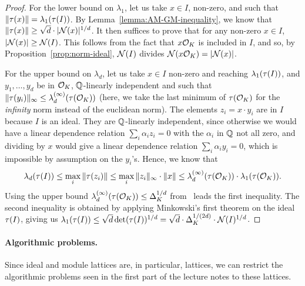 \begin{proof}
For the lower bound on $\lambda_1$, let us take $x \in I$, non-zero, and such that $\|\tau(x)\| = \lambda_1(\tau(I))$. By Lemma~\ref{lemma:AM-GM-inequality}, we know that $\|\tau(x)\| \geq \sqrt{d} \cdot |\mathcal{N}(x)|^{1/d}$. It then suffices to prove that for any non-zero $x \in I$, $|\mathcal{N}(x)| \geq \mathcal{N}(I)$. This follows from the fact that $x \mathcal{O}_K$ is included in $I$, and so, by Proposition~\ref{prop:norm-ideal}, $\mathcal{N}(I)$ divides $\mathcal{N}(x \mathcal{O}_K) = |\mathcal{N}(x)|$.

For the upper bound on $\lambda_d$, let us take $x \in I$ non-zero and reaching $\lambda_1(\tau(I))$, and $y_1, \dots, y_d$ be in $\mathcal{O}_K$, $\mathbb{Q}$-linearly independent and such that $\|\tau(y_i)\|_\infty \leq \lambda_d^{(\infty)}(\tau(\mathcal{O}_K))$ (here, we take the last minimum of $\tau(\mathcal{O}_K)$ for the \emph{infinity} norm instead of the euclidean norm). The elements $z_i = x \cdot y_i$ are in $I$ because $I$ is an ideal. They are $\mathbb{Q}$-linearly independent, since otherwise we would have a linear dependence relation $\sum_i \alpha_i z_i = 0$ with the $\alpha_i$ in $\mathbb{Q}$ not all zero, and dividing by $x$ would give a linear dependence relation $\sum_i \alpha_i y_i = 0$, which is impossible by assumption on the $y_i$'s.
Hence, we know that 
\[\lambda_d(\tau(I)) \leq \max_i \|\tau(z_i)\| \leq \max_i \|z_i\|_\infty \cdot \|x\| \leq \lambda_d^{(\infty)}(\tau(\mathcal{O}_K)) \cdot \lambda_1(\tau(\mathcal{O}_K)).\]
Using the upper bound $\lambda_d^{(\infty)}(\tau(\mathcal{O}_K)) \leq \Delta_K^{1/d}$ from~\cite[Theorem A.4]{KoenThesis} leads the first inequality. The second inequality is obtained by applying Minkowski's first theorem on the ideal $\tau(I)$, giving us $\lambda_1(\tau(I)) \leq \sqrt{d} \det(\tau(I))^{1/d} = \sqrt{d} \cdot \Delta_K^{1/(2d)} \cdot \mathcal{N}(I)^{1/d}$.
\end{proof}



\paragraph{Algorithmic problems.} Since ideal and module lattices are, in particular, lattices, we can restrict the algorithmic problems seen in the first part of the lecture notes to these lattices.

